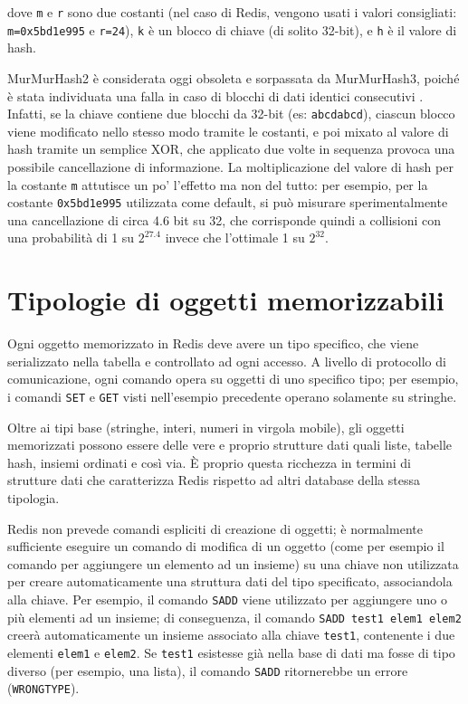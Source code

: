 dove \verb|m| e \verb|r| sono due costanti (nel caso di Redis, vengono usati i valori consigliati:
\verb|m=0x5bd1e995| e \verb|r=24|), \verb|k| è un blocco di chiave (di solito 32-bit), e \verb|h| è
il valore di hash.

MurMurHash2 è considerata oggi obsoleta e sorpassata da MurMurHash3, poiché è stata individuata una
falla in caso di blocchi di dati identici consecutivi \cite{murmur2flaw}. Infatti, se la chiave
contiene due blocchi da 32-bit (es: \verb|abcdabcd|), ciascun blocco viene modificato nello stesso
modo tramite le costanti, e poi mixato al valore di hash tramite un semplice XOR, che applicato due
volte in sequenza provoca una possibile cancellazione di informazione. La moltiplicazione del valore
di hash per la costante \verb|m| attutisce un po' l'effetto ma non del tutto: per esempio, per la
costante \verb|0x5bd1e995| utilizzata come default, si può misurare sperimentalmente una
cancellazione di circa 4.6 bit su 32, che corrisponde quindi a collisioni con una probabilità di 1
su $2 ^ {27.4}$ invece che l'ottimale 1 su $2 ^ {32}$.


\section{Tipologie di oggetti memorizzabili}

Ogni oggetto memorizzato in Redis deve avere un tipo specifico, che viene serializzato
nella tabella e controllato ad ogni accesso. A livello di protocollo di comunicazione,
ogni comando opera su oggetti di uno specifico tipo; per esempio, i comandi \verb|SET|
e \verb|GET| visti nell'esempio precedente operano solamente su stringhe.

Oltre ai tipi base (stringhe, interi, numeri in virgola mobile), gli oggetti memorizzati
possono essere delle vere e proprio strutture dati quali liste, tabelle hash, insiemi
ordinati e così via. È proprio questa ricchezza in termini di strutture dati che caratterizza
Redis rispetto ad altri database della stessa tipologia.

Redis non prevede comandi espliciti di creazione di oggetti; è normalmente sufficiente
eseguire un comando di modifica di un oggetto (come per esempio il comando per aggiungere
un elemento ad un insieme) su una chiave non utilizzata per creare automaticamente una
struttura dati del tipo specificato, associandola alla chiave. Per esempio, il comando
\verb|SADD| viene utilizzato per aggiungere uno o più elementi ad un insieme; di
conseguenza, il comando \verb|SADD test1 elem1 elem2| creerà automaticamente un insieme 
associato alla chiave \verb|test1|, contenente i due elementi \verb|elem1| e \verb|elem2|.
Se \verb|test1| esistesse già nella base di dati ma fosse di tipo diverso (per esempio,
una lista), il comando \verb|SADD| ritornerebbe un errore (\verb|WRONGTYPE|).

